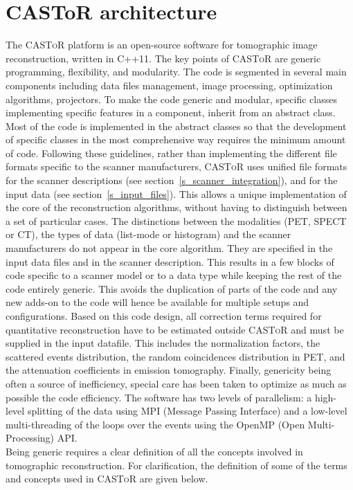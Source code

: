 \documentclass[a4paper, 11pt]{article}
\newcommand{\castor}{\textsc{CASToR}\xspace}
\begin{document}
\section{CASToR architecture}
\label{s_architecture}

The \castor platform is an open-source software for tomographic image reconstruction, written in C++11.
The key points of \castor are generic programming, flexibility, and modularity. 
The code is segmented in several main components including data files management, image processing, optimization algorithms, projectors. 
To make the code generic and modular, specific classes implementing specific features in a component, inherit from an abstract class. 
Most of the code is implemented in the abstract classes so that the development of specific classes in the most comprehensive way requires
the minimum amount of code. 
Following these guidelines, rather than implementing the different file formats specific to the scanner manufacturers, \castor uses unified
file formats for the scanner descriptions (see section~\ref{s_scanner_integration}), and for the input data (see section~\ref{s_input_files}).
This allows a unique implementation of the core of the reconstruction algorithms, without having to distinguish between a set of particular
cases.
The distinctions between the modalities (PET, SPECT or CT), the types of data (list-mode or histogram) and the scanner manufacturers do not appear
in the core algorithm.
They are specified in the input data files and in the scanner description.
This results in a few blocks of code specific to a scanner model or to a data type while keeping the rest of the code entirely generic.
This avoids the duplication of parts of the code and any new adds-on to the code will hence be available for multiple setups and configurations.
Based on this code design, all correction terms required for quantitative reconstruction have to be estimated outside \castor and
must be supplied in the input datafile. 
This includes the normalization factors, the scattered events distribution, the random coincidences distribution in PET, and the attenuation
coefficients in emission tomography. 
Finally, genericity  being often a source of inefficiency, special care has been taken to optimize as much as possible the code
efficiency. 
The software has two levels of parallelism: a high-level splitting of the data using  MPI (Message Passing Interface) and a low-level
multi-threading of the loops over the events using the OpenMP (Open Multi-Processing) API.
\\
Being generic requires a clear definition of all the concepts involved in tomographic reconstruction.
For clarification, the definition of some of the terms and concepts used in \castor are given below.
\end{document}
